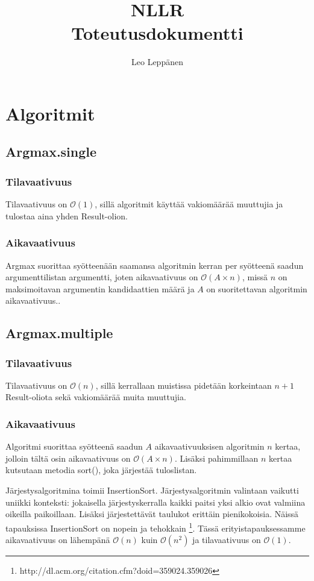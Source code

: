 \documentclass[12pt,a4paper]{article}
\author{Leo Leppänen}
\title{NLLR \\ Toteutusdokumentti}
\begin{document}
\maketitle

\section{Algoritmit}

\subsection{Argmax.single}
\subsubsection{Tilavaativuus}
Tilavaativuus on $\mathcal{O}(1)$, sillä algoritmit käyttää vakiomäärää muuttujia ja tulostaa aina yhden Result-olion.

\subsubsection{Aikavaativuus}
Argmax suorittaa syötteenään saamansa algoritmin kerran per syötteenä saadun argumenttilistan argumentti, joten aikavaativuus on $\mathcal{O}(A \times n)$, missä $n$ on maksimoitavan argumentin kandidaattien määrä ja $A$ on suoritettavan algoritmin aikavaativuus..

\subsection{Argmax.multiple}
\subsubsection{Tilavaativuus}
Tilavaativuus on $\mathcal{O}(n)$, sillä kerrallaan muistissa pidetään korkeintaan $n+1$ Result-oliota sekä vakiomäärää muita muuttujia.

\subsubsection{Aikavaativuus}
Algoritmi suorittaa syötteenä saadun $A$ aikavaativuuksisen algoritmin $n$ kertaa, jolloin tältä osin aikavaativuus on $\mathcal{O}(A \times n)$. Lisäksi pahimmillaan $n$ kertaa kutsutaan metodia sort(), joka järjestää tuloslistan.

Järjestysalgoritmina toimii InsertionSort. Järjestysalgoritmin valintaan vaikutti uniikki konteksti: jokaisella järjestyskerralla kaikki paitsi yksi alkio ovat valmiina oikeilla paikoillaan. Lisäksi järjestettävät taulukot erittäin pienikokoisia. Näissä tapauksissa InsertionSort on nopein ja tehokkain \footnote{http://dl.acm.org/citation.cfm?doid=359024.359026}. Tässä erityistapauksessamme aikavaativuus on lähempänä $\mathcal{O}(n)$ kuin $\mathcal{O}(n^2)$ ja tilavaativuus on $\mathcal{O}(1)$.
\end{document}
